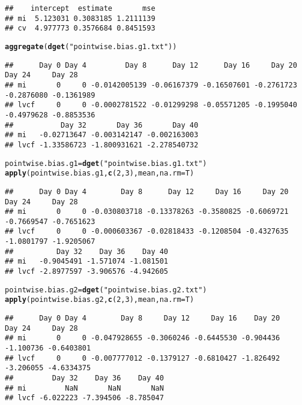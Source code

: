 \documentclass{article}\usepackage[]{graphicx}\usepackage[]{color}
\makeatletter
\newcommand{\hlnum}[1]{\textcolor[rgb]{0.686,0.059,0.569}{#1}}%
\newcommand{\hlstr}[1]{\textcolor[rgb]{0.192,0.494,0.8}{#1}}%
\newcommand{\hlstd}[1]{\textcolor[rgb]{0.345,0.345,0.345}{#1}}%
\newcommand{\hlkwb}[1]{\textcolor[rgb]{0.69,0.353,0.396}{#1}}%
\newcommand{\hlkwc}[1]{\textcolor[rgb]{0.333,0.667,0.333}{#1}}%
\newcommand{\hlkwd}[1]{\textcolor[rgb]{0.737,0.353,0.396}{\textbf{#1}}}%
\newenvironment{kframe}{%
 \def\at@end@of@kframe{}%
 \ifinner\ifhmode%
  \def\at@end@of@kframe{\end{minipage}}%
  \begin{minipage}{\columnwidth}%
 \fi\fi%
 \def\FrameCommand##1{\hskip\@totalleftmargin \hskip-\fboxsep
 \colorbox{shadecolor}{##1}\hskip-\fboxsep
     \hskip-\linewidth \hskip-\@totalleftmargin \hskip\columnwidth}%
 \MakeFramed {\advance\hsize-\width
   \@totalleftmargin\z@ \linewidth\hsize
   \@setminipage}}%
 {\par\unskip\endMakeFramed%
 \at@end@of@kframe}
\newenvironment{knitrout}{}{} %
\makeatother
\begin{document}
\begin{knitrout}
\begin{kframe}
\begin{alltt}
\end{alltt}
\begin{verbatim}
##    intercept  estimate       mse
## mi  5.123031 0.3083185 1.2111139
## cv  4.977773 0.3576684 0.8451593
\end{verbatim}
\begin{alltt}
\hlkwd{aggregate}\hlstd{(}\hlkwd{dget}\hlstd{(}\hlstr{"pointwise.bias.g1.txt"}\hlstd{))}
\end{alltt}
\begin{verbatim}
##      Day 0 Day 4         Day 8      Day 12      Day 16     Day 20     Day 24     Day 28
## mi       0     0 -0.0142005139 -0.06167379 -0.16507601 -0.2761723 -0.2876080 -0.1361989
## lvcf     0     0 -0.0002781522 -0.01299298 -0.05571205 -0.1995040 -0.4979628 -0.8853536
##           Day 32       Day 36       Day 40
## mi   -0.02713647 -0.003142147 -0.002163003
## lvcf -1.33586723 -1.800931621 -2.278540732
\end{verbatim}
\begin{alltt}
\hlstd{pointwise.bias.g1} \hlkwb{=} \hlkwd{dget}\hlstd{(}\hlstr{"pointwise.bias.g1.txt"}\hlstd{)}
\hlkwd{apply}\hlstd{(pointwise.bias.g1,} \hlkwd{c}\hlstd{(}\hlnum{2}\hlstd{,}\hlnum{3}\hlstd{), mean,} \hlkwc{na.rm}\hlstd{=T)}
\end{alltt}
\begin{verbatim}
##      Day 0 Day 4        Day 8      Day 12     Day 16     Day 20     Day 24     Day 28
## mi       0     0 -0.030803718 -0.13378263 -0.3580825 -0.6069721 -0.7669547 -0.7651623
## lvcf     0     0 -0.000603367 -0.02818433 -0.1208504 -0.4327635 -1.0801797 -1.9205067
##          Day 32    Day 36    Day 40
## mi   -0.9045491 -1.571074 -1.081501
## lvcf -2.8977597 -3.906576 -4.942605
\end{verbatim}
\begin{alltt}
\hlstd{pointwise.bias.g2} \hlkwb{=} \hlkwd{dget}\hlstd{(}\hlstr{"pointwise.bias.g2.txt"}\hlstd{)}
\hlkwd{apply}\hlstd{(pointwise.bias.g2,} \hlkwd{c}\hlstd{(}\hlnum{2}\hlstd{,}\hlnum{3}\hlstd{), mean,} \hlkwc{na.rm}\hlstd{=T)}
\end{alltt}
\begin{verbatim}
##      Day 0 Day 4        Day 8     Day 12     Day 16    Day 20    Day 24     Day 28
## mi       0     0 -0.047928655 -0.3060246 -0.6445530 -0.904436 -1.100736 -0.6403801
## lvcf     0     0 -0.007777012 -0.1379127 -0.6810427 -1.826492 -3.206055 -4.6334375
##         Day 32    Day 36    Day 40
## mi         NaN       NaN       NaN
## lvcf -6.022223 -7.394506 -8.785047
\end{verbatim}
\end{kframe}
\end{knitrout}
\end{document}

